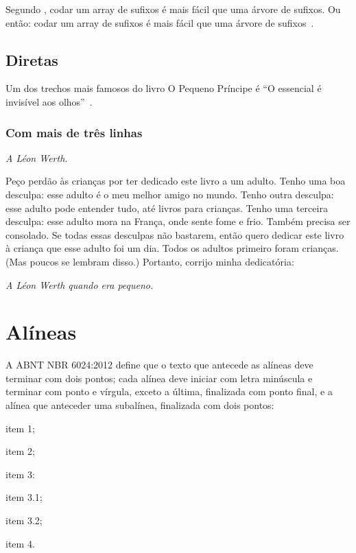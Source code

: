\documentclass[serif, brazilian]{uffstex}
\begin{document}
Segundo \textcite{halim3rd}, codar um array de sufixos é mais fácil que uma árvore de sufixos. Ou então: codar um array de sufixos é mais fácil que uma árvore de sufixos~\cite[253]{halim3rd}.

\section{Diretas}

Um dos trechos mais famosos do livro O Pequeno Príncipe é \enquote{O essencial é invisível aos olhos}~\cite[58]{exupery15}.

\subsection{Com mais de três linhas}

\begin{citacao}
\textit{A Léon Werth.}

Peço perdão às crianças por ter dedicado este livro a um adulto. Tenho uma boa desculpa: esse adulto é o meu melhor amigo no mundo. Tenho outra desculpa: esse adulto pode entender tudo, até livros para crianças. Tenho uma terceira desculpa: esse adulto mora na França, onde sente fome e frio. Também precisa ser consolado. Se todas essas desculpas não bastarem, então quero dedicar este livro à criança que esse adulto foi um dia. Todos os adultos primeiro foram crianças. (Mas poucos se lembram disso.) Portanto, corrijo minha dedicatória:

\textit{A Léon Werth quando era pequeno.}~\cite{exupery15}
\end{citacao}

\chapter{Alíneas}

A ABNT NBR 6024:2012 define que o texto que antecede as alíneas deve terminar com dois pontos; cada alínea deve iniciar com letra minúscula e terminar com ponto e vírgula, exceto a última, finalizada com ponto final, e a alínea que anteceder uma subalínea, finalizada com dois pontos:

\begin{alineas}
  \item item 1;
  \item item 2;
  \item item 3:
  \begin{alineas} %
    \item item 3.1;
    \item item 3.2;
  \end{alineas}
  \item item 4.
\end{alineas}
\end{document}
